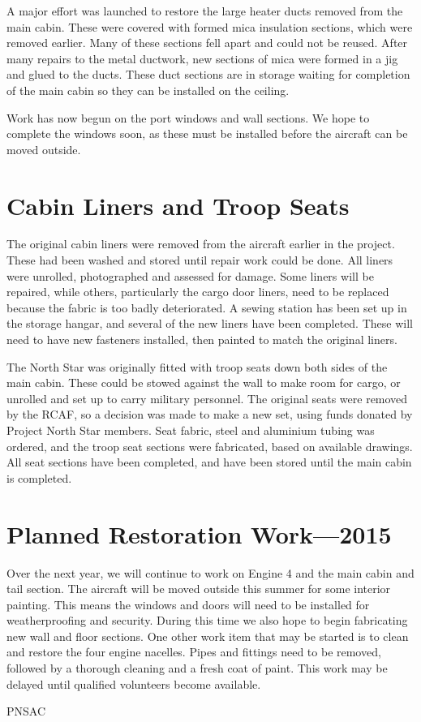 A major effort was launched to restore the large heater ducts removed
from the main cabin.  These were covered with formed mica insulation
sections, which were removed earlier.  Many of these sections fell
apart and could not be reused.  After many repairs to the metal
ductwork, new sections of mica were formed in a jig and glued to the
ducts.  These duct sections are in storage waiting for completion of
the main cabin so they can be installed on the ceiling.

Work has now begun on the port windows and wall sections.  We hope to
complete the windows soon, as these must be installed before the
aircraft can be moved outside.

\section{Cabin Liners and Troop Seats}
\label{sec:liners_troop_seats}

The original cabin liners were removed from the aircraft earlier in
the project.  These had been washed and stored until repair work could
be done.  All liners were unrolled, photographed and assessed for
damage.  Some liners will be repaired, while others, particularly the
cargo door liners, need to be replaced because the fabric is too badly
deteriorated.  A sewing station has been set up in the storage hangar,
and several of the new liners have been completed.  These will need to
have new fasteners installed, then painted to match the original
liners.

The North Star was originally fitted with troop seats down both sides
of the main cabin.  These could be stowed against the wall to make
room for cargo, or unrolled and set up to carry military personnel.
The original seats were removed by the RCAF, so a decision was made to
make a new set, using funds donated by Project North Star members.
Seat fabric, steel and aluminium tubing was ordered, and the troop seat
sections were fabricated, based on available drawings.  All seat
sections have been completed, and have been stored until the main
cabin is completed.

\section{Planned Restoration Work---2015}
\label{sec:plannedwork}

Over the next year, we will continue to work on Engine 4 and the main
cabin and tail section.  The aircraft will be moved outside this
summer for some interior painting.  This means the windows and doors
will need to be installed for weatherproofing and security.  During
this time we also hope to begin fabricating new wall and floor
sections.  One other work item that may be started is to clean and
restore the four engine nacelles.  Pipes and fittings need to be
removed, followed by a thorough cleaning and a fresh coat of paint.
This work may be delayed until qualified volunteers become available.

\begin{footnotesize}
  \raggedleft PNSAC\\
\end{footnotesize}



